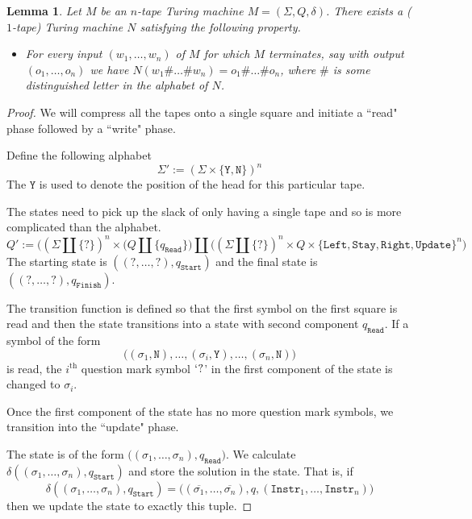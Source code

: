 \documentclass[12pt]{article}
\theoremstyle{plain}
\newtheorem{lemma}[thm]{Lemma}
\theoremstyle{definition}
\begin{document}
\begin{lemma}
	Let $M$ be an $n$-tape Turing machine $M = (\Sigma, Q, \delta)$. There exists a ($1$-tape) Turing machine $N$ satisfying the following property.
	\begin{itemize}
		\item For every input $(w_1,\ldots, w_n)$ of $M$ for which $M$ terminates, say with output $(o_1,\ldots, o_n)$ we have $N(w_1 \# \ldots \# w_n) = o_1\#\ldots\#o_n$, where $\#$ is some distinguished letter in the alphabet of $N$.
	\end{itemize}
\end{lemma}
\begin{proof}
	We will compress all the tapes onto a single square and initiate a ``read" phase followed by a ``write" phase.
	
	Define the following alphabet
	\begin{equation}
		\Sigma' := (\Sigma \times \{\texttt{Y}, \texttt{N}\})^n
	\end{equation}
	The $\texttt{Y}$ is used to denote the position of the head for this particular tape.
	
	The states need to pick up the slack of only having a single tape and so is more complicated than the alphabet.
	\begin{equation}
		Q' := \Big((\Sigma \coprod \{ ? \})^n \times (Q \coprod \{ q_{\texttt{Read}} \}\Big) \coprod \Big( (\Sigma \coprod \{ ? \})^n \times Q \times \{\texttt{Left}, \texttt{Stay}, \texttt{Right}, \texttt{Update}\}^n \Big)
	\end{equation}
	The starting state is $((?,\ldots, ?), q_{\texttt{Start}})$ and the final state is $((?,\ldots, ?), q_{\texttt{Finish}})$.
	
	The transition function is defined so that the first symbol on the first square is read and then the state transitions into a state with second component $q_{\texttt{Read}}$. If a symbol of the form
	\begin{equation}\label{eq:symbol_with_head}
		\big((\sigma_1, \texttt{N}), \ldots, (\sigma_i, \texttt{Y}), \ldots, (\sigma_n, \texttt{N})\big)
	\end{equation}
	is read, the $i^{\text{th}}$ question mark symbol $`?$' in the first component of the state is changed to $\sigma_i$.
	
	Once the first component of the state has no more question mark symbols, we transition into the ``update" phase.
	
	The state is of the form $\big((\sigma_1, \ldots, \sigma_n), q_{\texttt{Read}}\big)$. We calculate $\delta((\sigma_1, \ldots, \sigma_n), q_{\texttt{Start}})$ and store the solution in the state. That is, if
	\begin{equation}\label{eq:output_calculation}
		\delta((\sigma_1, \ldots, \sigma_n), q_{\texttt{Start}}) = \big((\overline{\sigma_1},\ldots, \overline{\sigma_n}), q, (\texttt{Instr}_1, \ldots, \texttt{Instr}_n)\big)
	\end{equation}
	then we update the state to exactly this tuple.
	

\end{proof}
\end{document}
